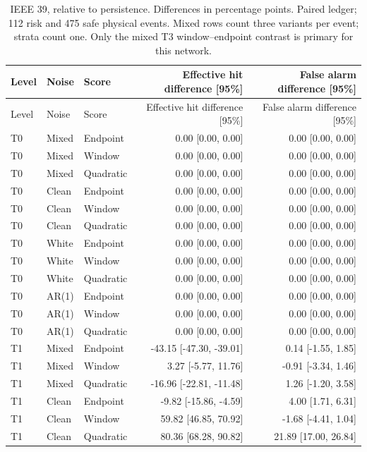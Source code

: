 \documentclass[10pt]{article}
\begin{document}
\begingroup\small\setlength{\tabcolsep}{3.8pt}
\begin{longtable}{lllrr}
\caption{IEEE 39, relative to persistence. Differences in percentage points. Paired ledger; 112 risk and 475 safe physical events. Mixed rows count three variants per event; strata count one. Only the mixed T3 window--endpoint contrast is primary for this network.}\\
\toprule Level & Noise & Score & Effective hit difference [95\%] & False alarm difference [95\%] \\\midrule\endfirsthead
\toprule Level & Noise & Score & Effective hit difference [95\%] & False alarm difference [95\%] \\\midrule\endhead
T0 & Mixed & Endpoint & 0.00 [0.00, 0.00] & 0.00 [0.00, 0.00] \\
T0 & Mixed & Window & 0.00 [0.00, 0.00] & 0.00 [0.00, 0.00] \\
T0 & Mixed & Quadratic & 0.00 [0.00, 0.00] & 0.00 [0.00, 0.00] \\
T0 & Clean & Endpoint & 0.00 [0.00, 0.00] & 0.00 [0.00, 0.00] \\
T0 & Clean & Window & 0.00 [0.00, 0.00] & 0.00 [0.00, 0.00] \\
T0 & Clean & Quadratic & 0.00 [0.00, 0.00] & 0.00 [0.00, 0.00] \\
T0 & White & Endpoint & 0.00 [0.00, 0.00] & 0.00 [0.00, 0.00] \\
T0 & White & Window & 0.00 [0.00, 0.00] & 0.00 [0.00, 0.00] \\
T0 & White & Quadratic & 0.00 [0.00, 0.00] & 0.00 [0.00, 0.00] \\
T0 & AR(1) & Endpoint & 0.00 [0.00, 0.00] & 0.00 [0.00, 0.00] \\
T0 & AR(1) & Window & 0.00 [0.00, 0.00] & 0.00 [0.00, 0.00] \\
T0 & AR(1) & Quadratic & 0.00 [0.00, 0.00] & 0.00 [0.00, 0.00] \\
T1 & Mixed & Endpoint & -43.15 [-47.30, -39.01] & 0.14 [-1.55, 1.85] \\
T1 & Mixed & Window & 3.27 [-5.77, 11.76] & -0.91 [-3.34, 1.46] \\
T1 & Mixed & Quadratic & -16.96 [-22.81, -11.48] & 1.26 [-1.20, 3.58] \\
T1 & Clean & Endpoint & -9.82 [-15.86, -4.59] & 4.00 [1.71, 6.31] \\
T1 & Clean & Window & 59.82 [46.85, 70.92] & -1.68 [-4.41, 1.04] \\
T1 & Clean & Quadratic & 80.36 [68.28, 90.82] & 21.89 [17.00, 26.84] \\

\end{longtable}
\end{document}
